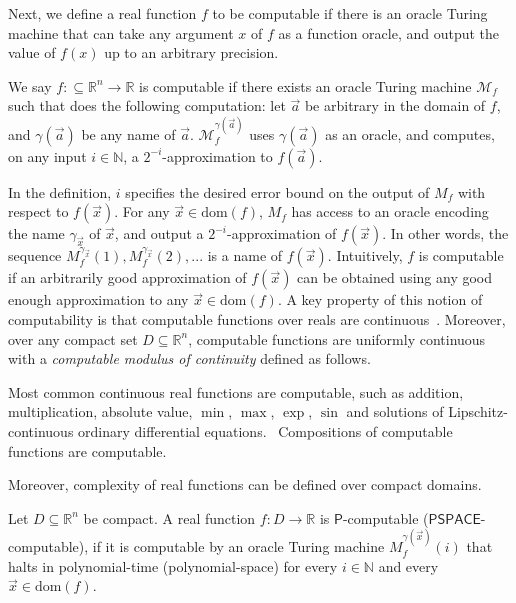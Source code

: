 \documentclass[envcountsect]{llncs}
\newcommand{\dom}{\mathrm{dom}}
\begin{document}
Next, we define a real function $f$ to be computable if there is an oracle Turing machine that can take any argument $x$ of $f$ as a function oracle, and output the value of $f(x)$ up to an arbitrary precision. 

\begin{definition} We say $f:\subseteq\mathbb{R}^n\rightarrow \mathbb{R}$ is computable if there exists an oracle Turing machine $\mathcal{M}_f$ such that does the following computation: let $\vec a$ be arbitrary in the domain of $f$, and $\gamma(\vec a)$ be any name of $\vec a$. $\mathcal{M}_f^{\gamma(\vec a)}$ uses $\gamma(\vec a)$ as an oracle, and computes, on any input $i\in \mathbb{N}$, a $2^{-i}$-approximation to $f(\vec a)$. 
\end{definition}



In the definition, $i$ specifies the desired error bound on the output of $M_f$ with respect to $f(\vec x)$. For any $\vec x\in \dom(f)$, $M_f$ has access to an oracle encoding the name $\gamma_{\vec x}$ of $\vec x$, and output a $2^{-i}$-approximation of $f(\vec x)$. In other words, the sequence $M_f^{\gamma_{\vec x}}(1), M_f^{\gamma_{\vec x}}(2), ...$ is a name of $f(\vec x)$. Intuitively, $f$ is computable if an arbitrarily good approximation of $f(\vec x)$ can be obtained using any good enough approximation to any $\vec x\in\dom(f)$. A key property of this notion of computability is that computable functions over reals are continuous~\cite{CAbook}. Moreover, over any compact set $D\subseteq \mathbb{R}^n$, computable functions are uniformly continuous with a {\em computable modulus of continuity} defined as follows. 

Most common continuous real functions are computable, such as addition, multiplication, absolute value, $\min$, $\max$, $\exp$, $\sin$ and solutions of Lipschitz-continuous ordinary differential equations.~\cite{CAbook} Compositions of computable functions are computable.


Moreover, complexity of real functions can be defined over compact domains. 

\begin{definition}[\cite{Ko92}] Let $D\subseteq \mathbb{R}^n$ be compact. A real function $f:D\rightarrow\mathbb{R}$ is $\mathsf{P}$-computable ($\mathsf{PSPACE}$-computable), if it is computable by an oracle Turing machine $M_{f}^{\gamma(\vec x)}(i)$ that halts in polynomial-time (polynomial-space) for every $i\in \mathbb{N}$ and every $\vec x\in \dom(f)$. 
\end{definition}
\end{document}
